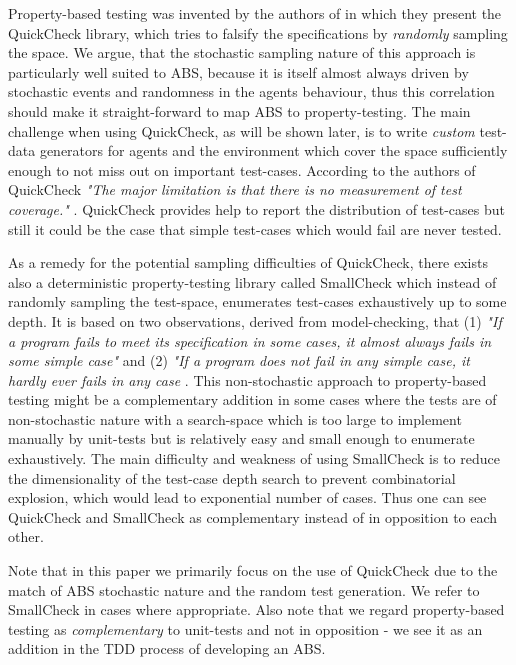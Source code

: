 Property-based testing was invented by the authors of \cite{claessen_quickcheck:_2000, claessen_testing_2002} in which they present the QuickCheck library, which tries to falsify the specifications by \textit{randomly} sampling the space. We argue, that the stochastic sampling nature of this approach is particularly well suited to ABS, because it is itself almost always driven by stochastic events and randomness in the agents behaviour, thus this correlation should make it straight-forward to map ABS to property-testing. The main challenge when using QuickCheck, as will be shown later, is to write \textit{custom} test-data generators for agents and the environment which cover the space sufficiently enough to not miss out on important test-cases. According to the authors of QuickCheck \textit{"The major limitation is that there is no measurement of test coverage."} \cite{claessen_quickcheck:_2000}. QuickCheck provides help to report the distribution of test-cases but still it could be the case that simple test-cases which would fail are never tested.

As a remedy for the potential sampling difficulties of QuickCheck, there exists also a deterministic property-testing library called SmallCheck \cite{runciman_smallcheck_2008} which instead of randomly sampling the test-space, enumerates test-cases exhaustively up to some depth. It is based on two observations, derived from model-checking, that (1) \textit{"If a program fails to meet its specification in some cases, it almost always fails in some simple case"} and (2) \textit{"If a program does not fail in any simple case, it hardly ever fails in any case} \cite{runciman_smallcheck_2008}. This non-stochastic approach to property-based testing might be a complementary addition in some cases where the tests are of non-stochastic nature with a search-space which is too large to implement manually by unit-tests but is relatively easy and small enough to enumerate exhaustively. The main difficulty and weakness of using SmallCheck is to reduce the dimensionality of the test-case depth search to prevent combinatorial explosion, which would lead to exponential number of cases. Thus one can see QuickCheck and SmallCheck as complementary instead of in opposition to each other.

Note that in this paper we primarily focus on the use of QuickCheck due to the match of ABS stochastic nature and the random test generation. We refer to SmallCheck in cases where appropriate. Also note that we regard property-based testing as \textit{complementary} to unit-tests and not in opposition - we see it as an addition in the TDD process of developing an ABS.

